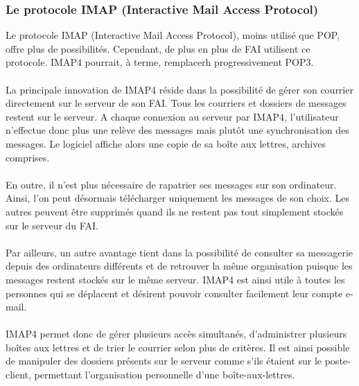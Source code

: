 \documentclass[french]{report}
\begin{document}
\begin{titlepage}
\subsubsection{\LARGE Le protocole IMAP (Interactive Mail Access Protocol)}
\LARGE Le protocole IMAP (Interactive Mail Access Protocol), moins utilisé que POP, offre plus de possibilités. Cependant, de plus en plus de FAI utilisent ce protocole. IMAP4 pourrait, à terme, remplacerh  progressivement POP3.\\ \\
La principale innovation de IMAP4 réside dans la possibilité de gérer son courrier directement sur le serveur de son FAI. Tous les courriers et dossiers de messages restent sur le serveur. A chaque connexion au serveur par IMAP4, l'utilisateur n'effectue donc plus une relève des messages mais plutôt une synchronisation des messages. Le logiciel affiche alors une copie de sa boîte aux lettres, archives comprises.\\ \\
En outre, il n'est plus nécessaire de rapatrier ses messages sur son ordinateur. Ainsi, l'on peut désormais télécharger uniquement les messages de son choix. Les autres peuvent être supprimés quand ils ne restent pas tout simplement stockés sur le serveur du FAI.\\ \\
Par ailleurs, un autre avantage tient dans la possibilité de consulter sa messagerie depuis des ordinateurs différents et de retrouver la même organisation puisque les messages restent stockés sur le même serveur. IMAP4 est ainsi utile à toutes les personnes qui se déplacent et désirent pouvoir consulter facilement leur compte e-mail.\\ \\
IMAP4 permet donc de gérer plusieurs accès simultanés, d'administrer plusieurs boîtes aux lettres et de trier le courrier selon plus de critères. Il est ainsi possible de manipuler des dossiers présents sur le serveur comme s'ils étaient sur le poste-client, permettant l'organisation personnelle d'une boîte-aux-lettres.



\end{titlepage}
\end{document}
